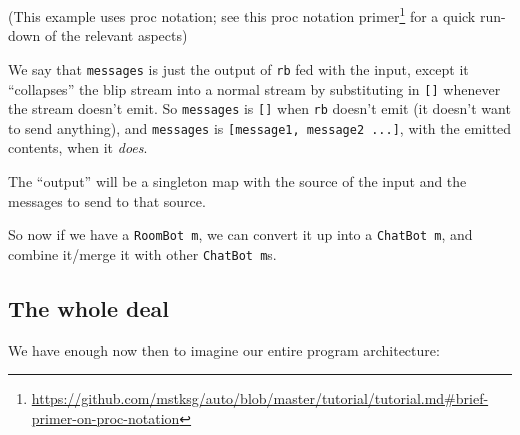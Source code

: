 \documentclass[]{article}
\newenvironment{Shaded}{}{}
\newcommand{\KeywordTok}[1]{\textcolor[rgb]{0.00,0.44,0.13}{\textbf{{#1}}}}
\newcommand{\DataTypeTok}[1]{\textcolor[rgb]{0.56,0.13,0.00}{{#1}}}
\newcommand{\CommentTok}[1]{\textcolor[rgb]{0.38,0.63,0.69}{\textit{{#1}}}}
\newcommand{\OtherTok}[1]{\textcolor[rgb]{0.00,0.44,0.13}{{#1}}}
\newcommand{\FunctionTok}[1]{\textcolor[rgb]{0.02,0.16,0.49}{{#1}}}
\newcommand{\NormalTok}[1]{{#1}}
\renewcommand{\href}[2]{#2\footnote{\url{#1}}}
\begin{document}
\begin{Shaded}
\end{Shaded}

(This example uses proc notation; see this
\href{https://github.com/mstksg/auto/blob/master/tutorial/tutorial.md\#brief-primer-on-proc-notation}{proc
notation primer} for a quick run-down of the relevant aspects)

We say that \texttt{messages} is just the output of \texttt{rb} fed with the input, except it
``collapses'' the blip stream into a normal stream by substituting in \texttt{{[}{]}} whenever the
stream doesn't emit. So \texttt{messages} is \texttt{{[}{]}} when \texttt{rb} doesn't emit (it
doesn't want to send anything), and \texttt{messages} is \texttt{{[}message1,\ message2\ ...{]}},
with the emitted contents, when it \emph{does}.

The ``output'' will be a singleton map with the source of the input and the messages to send to that
source.

So now if we have a \texttt{RoomBot\ m}, we can convert it up into a \texttt{ChatBot\ m}, and
combine it/merge it with other \texttt{ChatBot\ m}s.

\subsection{The whole deal}\label{the-whole-deal}

We have enough now then to imagine our entire program architecture:
\end{document}

